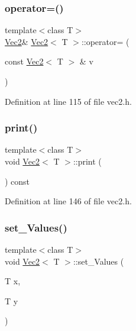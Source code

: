 \mbox{\label{class_vec2_ad31c26f71af2b9068479184b9c829e18}} 
\subsubsection{\texorpdfstring{operator=()}{operator=()}\hspace{0.1cm}{\footnotesize\ttfamily [2/2]}}
{\footnotesize\ttfamily template$<$class T$>$ \\
\mbox{\hyperlink{class_vec2}{Vec2}}\& \mbox{\hyperlink{class_vec2}{Vec2}}$<$ T $>$\+::operator= (\begin{DoxyParamCaption}\item[{const \mbox{\hyperlink{class_vec2}{Vec2}}$<$ T $>$ \&}]{v }\end{DoxyParamCaption})\hspace{0.3cm}{\ttfamily [inline]}}



Definition at line 115 of file vec2.\+h.

\mbox{\label{class_vec2_ad7de6de0f736bccf0ebb5c443de1af0e}} 
\subsubsection{\texorpdfstring{print()}{print()}}
{\footnotesize\ttfamily template$<$class T$>$ \\
void \mbox{\hyperlink{class_vec2}{Vec2}}$<$ T $>$\+::print (\begin{DoxyParamCaption}{ }\end{DoxyParamCaption}) const\hspace{0.3cm}{\ttfamily [inline]}}



Definition at line 146 of file vec2.\+h.

\mbox{\label{class_vec2_a238a918f6d2695dd187a9778982a1769}} 
\subsubsection{\texorpdfstring{set\_Values()}{set\_Values()}}
{\footnotesize\ttfamily template$<$class T$>$ \\
void \mbox{\hyperlink{class_vec2}{Vec2}}$<$ T $>$\+::set\+\_\+\+Values (\begin{DoxyParamCaption}\item[{T}]{x,  }\item[{T}]{y }\end{DoxyParamCaption})\hspace{0.3cm}{\ttfamily [inline]}}



